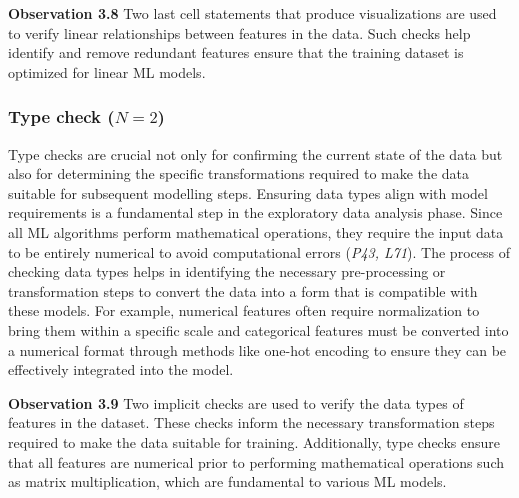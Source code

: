 \documentclass[smallextended]{svjour3}       %
\newcommand{\highlight}[1]{\begin{framed}%
  \noindent#1
\end{framed}}
\providecommand{\DIFaddbegin}{} %
\providecommand{\DIFaddend}{} %
\providecommand{\DIFdelbegin}{} %
\providecommand{\DIFdelend}{} %
\newcommand{\DIFscaledelfig}{0.5}
\newlength{\DIFdelgraphicswidth} %
\newlength{\DIFdelgraphicsheight} %
\newcommand{\DIFaddincludegraphics}[2][]{{\color{blue}\fbox{\DIFOincludegraphics[#1]{#2}}}} %
\newcommand{\DIFdelincludegraphics}[2][]{%
\sbox{\DIFdelgraphicsbox}{\DIFOincludegraphics[#1]{#2}}%
\settoboxwidth{\DIFdelgraphicswidth}{\DIFdelgraphicsbox} %
\settoboxtotalheight{\DIFdelgraphicsheight}{\DIFdelgraphicsbox} %
\scalebox{\DIFscaledelfig}{%
\parbox[b]{\DIFdelgraphicswidth}{\usebox{\DIFdelgraphicsbox}\\[-\baselineskip] \rule{\DIFdelgraphicswidth}{0em}}\llap{\resizebox{\DIFdelgraphicswidth}{\DIFdelgraphicsheight}{%
\setlength{\unitlength}{\DIFdelgraphicswidth}%
\begin{picture}(1,1)%
\thicklines\linethickness{2pt} %
{\color[rgb]{1,0,0}\put(0,0){\framebox(1,1){}}}%
{\color[rgb]{1,0,0}\put(0,0){\line( 1,1){1}}}%
{\color[rgb]{1,0,0}\put(0,1){\line(1,-1){1}}}%
\end{picture}%
}\hspace*{3pt}}} %
} %
\DeclareRobustCommand{\DIFaddbegin}{\DIFOaddbegin \let\includegraphics\DIFaddincludegraphics} %
\DeclareRobustCommand{\DIFaddend}{\DIFOaddend \let\includegraphics\DIFOincludegraphics} %
\DeclareRobustCommand{\DIFdelbegin}{\DIFOdelbegin \let\includegraphics\DIFdelincludegraphics} %
\DeclareRobustCommand{\DIFdelend}{\DIFOaddend \let\includegraphics\DIFOincludegraphics} %
\begin{document}
\DIFdelbegin %
\DIFdelend \DIFaddbegin \highlight{\textbf{Observation 3.8} Two last cell statements that produce visualizations are used to verify linear relationships between features in the data. Such checks help identify and remove redundant features ensure that the training dataset is optimized for linear ML models.}
\DIFaddend 

\subsubsection{Type check ($N = 2$)}

Type checks are crucial not only for confirming the current state of the data but also for determining the specific transformations required to make the data suitable for subsequent modelling steps. Ensuring data types align with model requirements is a fundamental step in the exploratory data analysis phase. Since all ML algorithms perform mathematical operations, they require the input data to be entirely numerical to avoid computational errors (\emph{P43, L71}). The process of checking data types helps in identifying the necessary pre-processing or transformation steps to convert the data into a form that is compatible with these models. For example, numerical features often require normalization to bring them within a specific scale and categorical features must be converted into a numerical format through methods like one-hot encoding to ensure they can be effectively integrated into the model.

\DIFdelbegin %
\DIFdelend \DIFaddbegin \highlight{\textbf{Observation 3.9} Two implicit checks are used to verify the data types of features in the dataset. These checks inform the necessary transformation steps required to make the data suitable for training. Additionally, type checks ensure that all features are numerical prior to performing mathematical operations such as matrix multiplication, which are fundamental to various ML models.}
\DIFaddend 
\end{document}
